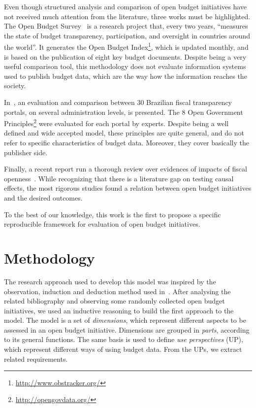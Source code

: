 Even though structured analysis and comparison of open budget initiatives have not received much attention from the literature, three works must be highlighted. 
The Open Budget Survey~\cite{InternationalBudgetPartnership2012} is a research project that, every two years, ``measures the state of budget transparency, participation, and oversight in countries around the world''. 
It generates the Open Budget Index\footnote{\url{http://www.obstracker.org/}}, which is updated monthly, and is based on the publication of eight key budget documents. Despite being a very useful comparison tool, this methodology does not evaluate information systems used to publish budget data, which are the way how the information reaches the society.

In~\cite{Beghin2014}, an evaluation and comparison between 30 Brazilian fiscal transparency portals, on several administration levels, is presented.
The 8 Open Government Principles\footnote{\url{http://opengovdata.org/}} were evaluated for each portal by experts.
Despite being a well defined and wide accepted model, these principles are quite general, and do not refer to specific characteristics of budget data. 
Moreover, they cover basically the publisher side.

Finally, a recent report run a thorough review over evidences of impacts of fiscal openness~\cite{Renzio2015}.
While recognizing that there is a literature gap on testing causal effects, the most rigorous studies found a relation between open budget initiatives and the desired outcomes.

To the best of our knowledge, this work is the first to propose a specific reproducible framework for evaluation of open budget initiatives.

\section{Methodology}
\label{sec:methodology} 
The research approach used to develop this model was inspired by the observation, induction and deduction method used in~\cite{Zuiderwijk2014}. 
After analysing the related bibliography and observing some randomly collected open budget initiatives, we used an inductive reasoning to build the first approach to the model.
The model is a set of \emph{dimensions}, which represent different aspects to be assessed in an open budget initiative. Dimensions are grouped in \emph{parts}, according to its general functions. The same basis is used to define \emph{use perspectives} (UP), which represent different ways of using budget data. 
From the UPs, we extract related requirements.

